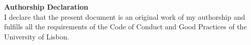 \noindent\textbf{Authorship Declaration}\\
I declare that the present document is an original work of my authorship and fulfills all the requirements of the Code of Conduct and Good Practices of the University of Lisbon.
